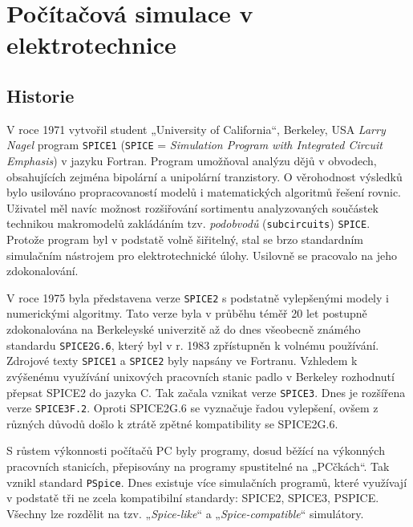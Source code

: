 \chapter{Počítačová simulace v elektrotechnice}
\minitoc

  \section{Historie}
    V roce 1971 vytvořil student „University of California“, Berkeley, USA \emph{Larry Nagel} 
    program \texttt{SPICE1} (\texttt{SPICE} = \emph{Simulation Program with Integrated Circuit 
    Emphasis}) v jazyku Fortran. Program umožňoval analýzu dějů v obvodech, obsahujících zejména 
    bipolární a
    unipolární tranzistory. O věrohodnost výsledků bylo usilováno propracovaností modelů i 
    matematických algoritmů řešení rovnic. Uživatel měl navíc  možnost roz\-ši\-řo\-vá\-ní 
    sortimentu analyzovaných součástek technikou makromodelů zakládáním tzv. \emph{pod\-ob\-vo\-dů}
    (\texttt{subcircuits}) \texttt{SPICE}. Protože program byl v podstatě volně šiřitelný, stal se 
    brzo standardním simulačním nástrojem pro elektrotechnické úlohy. Usilovně se pracovalo na jeho 
    zdokonalování.

    V roce 1975 byla představena verze \texttt{SPICE2} s podstatně vylepšenými modely i numerickými 
    algoritmy. Tato verze byla v průběhu téměř 20 let postupně zdokonalována na Berkeleyské 
    univerzitě až do dnes všeobecně známého standardu \texttt{SPICE2G.6}, který byl v r. 1983 
    zpřístupněn k volnému používání. Zdrojové texty \texttt{SPICE1} a \texttt{SPICE2} byly napsány 
    ve Fortranu. Vzhledem k zvýšenému využívání unixových pracovních stanic padlo v Berkeley 
    rozhodnutí přepsat SPICE2 do jazyka C. Tak začala vznikat verze \texttt{SPICE3}. Dnes je 
    rozšířena verze \texttt{SPICE3F.2}. Oproti SPICE2G.6 se vyznačuje řadou vylepšení, ovšem z 
    různých důvodů došlo k ztrátě zpětné kompatibility se SPICE2G.6.

    S růstem výkonnosti počítačů PC byly programy, dosud běžící na výkonných pracovních stanicích, 
    přepisovány na programy spustitelné na „PCčkách“. Tak vznikl standard \texttt{PSpice}. Dnes 
    existuje více simulačních programů, které využívají v podstatě tři ne zcela kompatibilní 
    standardy: SPICE2, SPICE3, PSPICE. Všechny lze rozdělit na tzv. „\emph{Spice-like}“ a 
    „\emph{Spice-compatible}“ simulátory.

